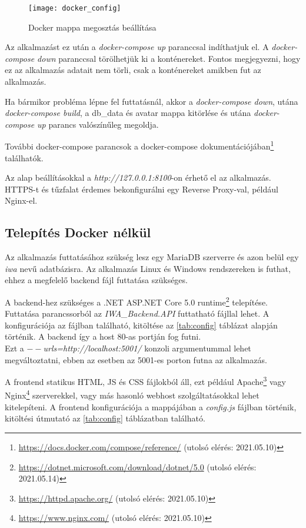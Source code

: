 \begin{figure}[H]
    \centering
    \texttt{[image: docker\_config]}
    \caption{Docker mappa megosztás beállítása}
\end{figure}

Az alkalmazást ez után a \textit{docker-compose up} paranccsal indíthatjuk el. A \textit{docker-compose down} paranccsal törölhetjük ki a konténereket. Fontos megjegyezni, hogy ez az alkalmazás adatait nem törli, csak a konténereket amikben fut az alkalmazás.

Ha bármikor probléma lépne fel futtatásnál, akkor a \textit{docker-compose down}, utána \textit{docker-compose build}, a db\_data és avatar mappa kitörlése és utána \textit{docker-compose up} parancs valószínűleg megoldja.

További docker-compose parancsok a docker-compose dokumentációjában\footnote{\url{https://docs.docker.com/compose/reference/} (utolsó elérés: 2021.05.10)} találhatók.

Az alap beállításokkal a \textit{http://127.0.0.1:8100}-on érhető el az alkalmazás. HTTPS-t és tűzfalat érdemes bekonfigurálni egy Reverse Proxy\cite{nginxReverseProxy}-val, például Nginx-el.

\subsection{Telepítés Docker nélkül}

Az alkalmazás futtatásához szükség lesz egy MariaDB szerverre és azon belül egy \textit{iwa} nevű adatbázisra. Az alkalmazás Linux és Windows rendszereken is futhat, ehhez a megfelelő backend fájl futtatása szükséges.

A backend-hez szükséges a .NET ASP.NET Core 5.0 runtime\footnote{\url{https://dotnet.microsoft.com/download/dotnet/5.0} (utolsó elérés: 2021.05.14)} telepítése. Futtatása parancssorból az \textit{IWA\_Backend.API} futtatható fájllal lehet. A konfigurációja az  fájlban található, kitöltése az \ref{tab:config} táblázat alapján történik. A backend így a host 80-as portján fog futni. \\ Ezt a \textit{$--$urls=http://localhost:5001/} konzoli argumentummal lehet megváltoztatni, ebben az esetben az 5001-es porton futna az alkalmazás.

A frontend statikus HTML, JS és CSS fájlokból áll, ezt például Apache\footnote{\url{https://httpd.apache.org/} (utolsó elérés: 2021.05.10)} vagy Nginx\footnote{\url{https://www.nginx.com/} (utolsó elérés: 2021.05.10)} szerverekkel, vagy más hasonló webhost szolgáltatásokkal lehet kitelepíteni. A frontend konfigurációja a mappájában a \textit{config.js} fájlban történik, kitöltési útmutató az \ref{tab:config} táblázatban található.

